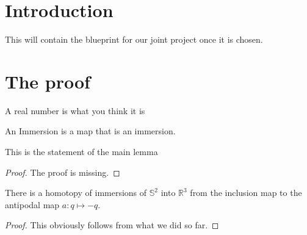 
\chapter*{Introduction}

This will contain the blueprint for our joint project once it is chosen.

\chapter{The proof}

\begin{definition}
  \label{def:real}
  \mathlibok
  A real number is what you think it is
\end{definition}

\begin{definition}[Immersion]
  \label{def:immersion}
  \leanok
  An Immersion is a map that is an immersion.
\end{definition}

\begin{lemma}
  \label{lem:main}
  \leanok
  This is the statement of the main lemma
\end{lemma}

\begin{proof}
  The proof is missing.
\end{proof}

\begin{theorem}[Smale 1958]
  \label{thm:sphere_eversion}
  \leanok
  There is a homotopy of immersions of $𝕊^2$ into $ℝ^3$ from the inclusion map to
  the antipodal map $a : q ↦ -q$.
\end{theorem}

\begin{proof}
  \leanok
  This obviously follows from what we did so far.
\end{proof}
